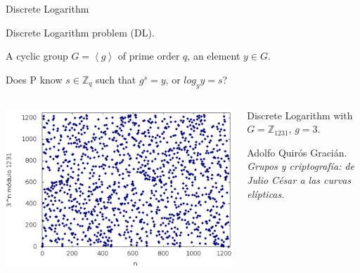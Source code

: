 \documentclass{beamer}
\begin{document}
\appendix








\begin{frame}{Discrete Logarithm}

\begin{description}[Parameters]
	\item[Name] Discrete Logarithm problem (DL).
	\item[Parameters] A cyclic group $G=\left\langle g \right\rangle$ of prime order $q$, an element $y\in G$.
	\item[Question] Does P know  $s\in \mathbb{Z}_q$ such that $g^s = y$, or $log_g y = s$?
\end{description}

\begin{columns}
	
	\begin{column}{0.5\textwidth}
		\includegraphics[width=\linewidth]{DL}
	\end{column}
	\begin{column}{0.5\textwidth}
		Discrete Logarithm with $G=\mathbb{Z}_{1231}$, $g=3$.
		
		\small{Adolfo Quirós Gracián. \textit{Grupos y criptografía: de Julio César a las curvas elípticas.}}
	\end{column}
	
\end{columns}
\end{frame}
\end{document}
